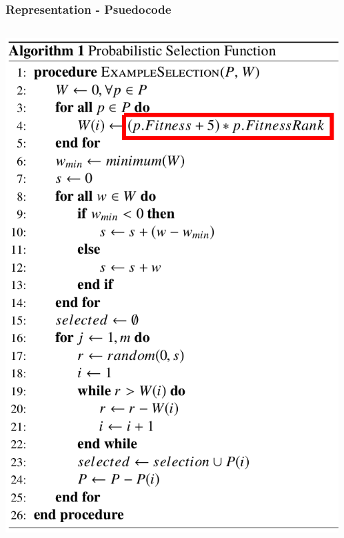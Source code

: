 \documentclass{beamer}
\begin{document}
\begin{frame}
\begin{columns}
\begin{column}{0.5\textwidth}
		\end{column}
		\end{columns}		

	\end{frame}	
	
	\begin{frame}
		\frametitle{Representation - Psuedocode}
		\begin{columns}
		\begin{column}{0.5\textwidth}
			\includegraphics[height=0.8\paperheight]{example_eppsea_code_red_highlight}		
		\end{column}
		\begin{column}{0.5\textwidth}

\end{column}
\end{columns}
\end{frame}
\end{document}
